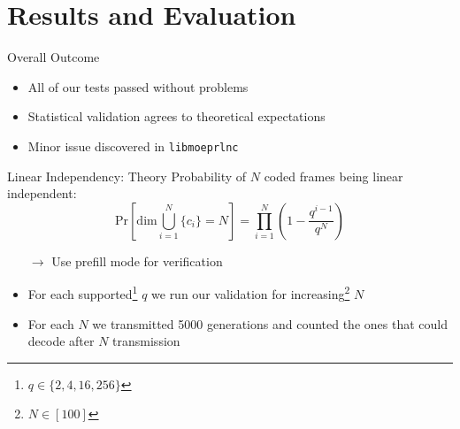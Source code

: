 \documentclass[t]{beamer} %
\begin{document}
\section{Results and Evaluation}

\begin{frame}{Overall Outcome}
	\begin{itemize}
		\item All of our tests passed without problems
		\item Statistical validation agrees to theoretical expectations
		\item Minor issue discovered in \texttt{libmoeprlnc}
	\end{itemize}
\end{frame}


\begin{frame}{Linear Independency: Theory}
	Probability of $N$ coded frames being linear independent:
	\begin{equation} 
		\text{Pr}\left[\text{dim}\bigcup_{i=1}^{N}\{c_i\} = N\right] = \prod_{i=1}^{N} \left(1 - \frac{q^{i - 1}}{q ^ {N}}\right)
		\label{eq:decode_prob}
	\end{equation}
	\begin{itemize}
		\item[$\rightarrow$] Use prefill mode for verification
		\item For each supported\footnote{$q\in\{2, 4, 16, 256\}$} $q$ we run our validation for increasing\footnote{$N\in[100]$} $N$
		\item For each $N$ we transmitted 5000 generations and counted the ones that could decode after $N$ transmission
	\end{itemize}
\end{frame}
\end{document}
